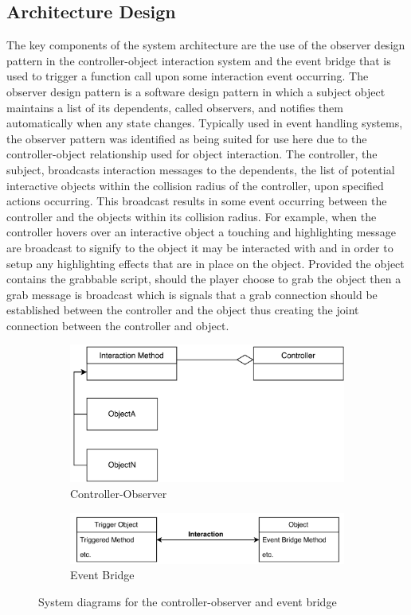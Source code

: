 \documentclass{l4proj}
\begin{document}
\subsection{Architecture Design}
\label{sec:decisiondesignarchitecture}
The key components of the system architecture are the use of the observer design pattern in the controller-object interaction system and the event bridge that is used to trigger a function call upon some interaction event occurring. The observer design pattern \cite{observer} is a software design pattern in which a subject object maintains a list of its dependents, called observers, and notifies them automatically when any state changes. Typically used in event handling systems, the observer pattern was identified as being suited for use here due to the controller-object relationship used for object interaction. The controller, the subject, broadcasts interaction messages to the dependents, the list of potential interactive objects within the collision radius of the controller, upon specified actions occurring. This broadcast results in some event occurring between the controller and the objects within its collision radius. For example, when the controller hovers over an interactive object a touching and highlighting message are broadcast to signify to the object it may be interacted with and in order to setup any highlighting effects that are in place on the object. Provided the object contains the grabbable script, should the player choose to grab the object then a grab message is broadcast which is signals that a grab connection should be established between the controller and the object thus creating the joint connection between the controller and object. 

\begin{figure}[h]
\begin{subfigure}[h]{0.4\linewidth}
\includegraphics[width=\linewidth]{dissertation/observer.png}
\caption{Controller-Observer}
\end{subfigure}
\hfill
\begin{subfigure}[h]{0.4\linewidth}
\includegraphics[width=\linewidth]{dissertation/event.png}
\caption{Event Bridge}
\end{subfigure}
\caption{System diagrams for the controller-observer and event bridge}
\end{figure}
\end{document}
